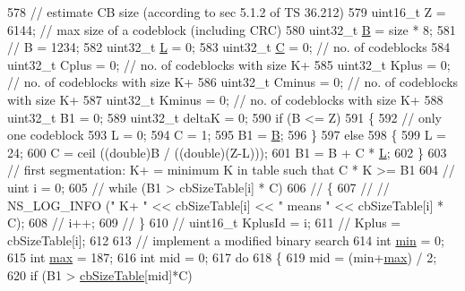 \begin{DoxyCode}
578   \textcolor{comment}{// estimate CB size (according to sec 5.1.2 of TS 36.212)}
579   uint16\_t Z = 6144; \textcolor{comment}{// max size of a codeblock (including CRC)}
580   uint32\_t \hyperlink{generate__test__data__lte__sinr_8m_abccb2cfa2bf43e135bc0e10740453f8c}{B} = size * 8;
581 \textcolor{comment}{//   B = 1234;}
582   uint32\_t \hyperlink{loss__ITU1411__NLOS__over__rooftop_8m_a0f93e2c2e7c447b4dfc5bcac7e346da1}{L} = 0;
583   uint32\_t \hyperlink{generate__test__data__lte__sinr_8m_ae24bb667d5023e5aaa1e71c3a15e447e}{C} = 0; \textcolor{comment}{// no. of codeblocks}
584   uint32\_t Cplus = 0; \textcolor{comment}{// no. of codeblocks with size K+}
585   uint32\_t Kplus = 0; \textcolor{comment}{// no. of codeblocks with size K+}
586   uint32\_t Cminus = 0; \textcolor{comment}{// no. of codeblocks with size K+}
587   uint32\_t Kminus = 0; \textcolor{comment}{// no. of codeblocks with size K+}
588   uint32\_t B1 = 0;
589   uint32\_t deltaK = 0;
590   \textcolor{keywordflow}{if} (B <= Z)
591     \{
592       \textcolor{comment}{// only one codeblock}
593       L = 0;
594       C = 1;
595       B1 = \hyperlink{generate__test__data__lte__sinr_8m_abccb2cfa2bf43e135bc0e10740453f8c}{B};
596     \}
597   \textcolor{keywordflow}{else}
598     \{
599       L = 24;
600       C = ceil ((\textcolor{keywordtype}{double})B / ((\textcolor{keywordtype}{double})(Z-L)));
601       B1 = B + C * \hyperlink{loss__ITU1411__NLOS__over__rooftop_8m_a0f93e2c2e7c447b4dfc5bcac7e346da1}{L};
602     \}
603   \textcolor{comment}{// first segmentation: K+ = minimum K in table such that C * K >= B1}
604 \textcolor{comment}{//   uint i = 0;}
605 \textcolor{comment}{//   while (B1 > cbSizeTable[i] * C)}
606 \textcolor{comment}{//     \{}
607 \textcolor{comment}{// //       NS\_LOG\_INFO (" K+ " << cbSizeTable[i] << " means " << cbSizeTable[i] * C);}
608 \textcolor{comment}{//       i++;}
609 \textcolor{comment}{//     \}}
610 \textcolor{comment}{//   uint16\_t KplusId = i;}
611 \textcolor{comment}{//   Kplus = cbSizeTable[i];}
612 
613   \textcolor{comment}{// implement a modified binary search}
614   \textcolor{keywordtype}{int} \hyperlink{80211b_8c_ac6afabdc09a49a433ee19d8a9486056d}{min} = 0;
615   \textcolor{keywordtype}{int} \hyperlink{80211b_8c_affe776513b24d84b39af8ab0930fef7f}{max} = 187;
616   \textcolor{keywordtype}{int} mid = 0;
617   \textcolor{keywordflow}{do}
618     \{
619       mid = (min+\hyperlink{80211b_8c_affe776513b24d84b39af8ab0930fef7f}{max}) / 2;
620       \textcolor{keywordflow}{if} (B1 > \hyperlink{namespacens3_a14a1917c5d5a089d32d5d29e3c380ab9}{cbSizeTable}[mid]*C)

\end{DoxyCode}
